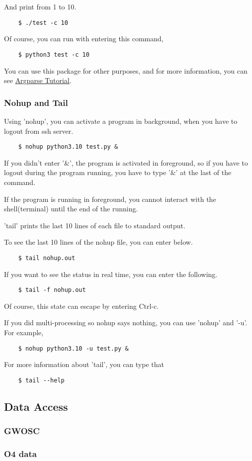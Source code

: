 And print from 1 to 10.

\begin{verbatim}
    $ ./test -c 10
\end{verbatim}

Of course, you can run with entering this command,

\begin{verbatim}
    $ python3 test -c 10
\end{verbatim}

You can use this package for other purposes, and for more information, you can see \href{https://docs.python.org/3/howto/argparse.html}{Argparse Tutorial}.

\subsubsection{Nohup and Tail}

Using 'nohup', you can activate a program in background, when you have to logout from ssh server.

\begin{verbatim}
    $ nohup python3.10 test.py &
\end{verbatim}

If you didn't enter '\&', the program is activated in foreground, so if you have to logout during the program running, you have to type '\&' at the last of the command.

If the program is running in foreground, you cannot interact with the shell(terminal) until the end of the running.

'tail' prints the last 10 lines of each file to standard output.

To see the last 10 lines of the nohup file, you can enter below.

\begin{verbatim}
    $ tail nohup.out
\end{verbatim}

If you want to see the status in real time, you can enter the following.

\begin{verbatim}
    $ tail -f nohup.out
\end{verbatim}

Of course, this state can escape by entering Ctrl-c.

If you did multi-processing so nohup says nothing, you can use 'nohup' and '-u'. For example,

\begin{verbatim}
    $ nohup python3.10 -u test.py &
\end{verbatim}

For more information about 'tail', you can type that

\begin{verbatim}
    $ tail --help
\end{verbatim}

\subsection{Data Access}

\subsubsection{GWOSC}

\subsubsection{O4 data}